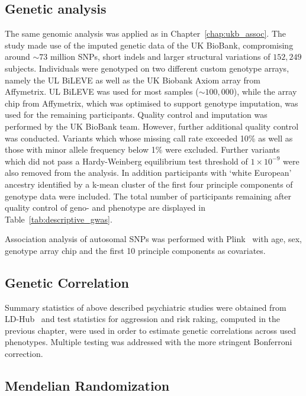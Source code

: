 \subsection{Genetic analysis}
\label{sub:genetic_analysis}

The same genomic analysis was applied as in Chapter~\ref{chap:ukb_assoc}.
The study made use of the imputed genetic data of the UK BioBank, compromising around $\sim73$ million SNPs, short indels and larger structural variations of $152,249$ subjects.
Individuals were genotyped on two different custom genotype arrays, namely the UL BiLEVE as well as the UK Biobank Axiom array from Affymetrix. 
UL BiLEVE was used for most samples ($\sim100,000$), while the array chip from Affymetrix, which was optimised to support genotype imputation, was used for the remaining participants. 
Quality control and imputation was performed by the UK BioBank team.
However, further additional quality control was conducted.
Variants which whose missing call rate exceeded 10\% as well as those with minor allele frequency below 1\% were excluded.
Further variants which did not pass a Hardy-Weinberg equilibrium test threshold of $1\times10^{-9}$ were also removed from the analysis.
In addition participants with `white European' ancestry identified by a k-mean cluster of the first four principle components of genotype data were included.
The total number of participants remaining after quality control of geno- and phenotype are displayed in Table~\ref{tab:descriptive_gwas}.

Association analysis of autosomal SNPs was performed with Plink~\cite{Purcell2007,Chang2015} with age, sex, genotype array chip and the first 10 principle components as covariates.

\subsection{Genetic Correlation}
\label{sub:genetic_correlation}

Summary statistics of above described psychiatric studies were obtained from LD-Hub~\cite{ZHENG2016} and test statistics for aggression and risk raking, computed in the previous chapter, were used in order to estimate genetic correlations across used phenotypes.
Multiple testing was addressed with the more stringent Bonferroni correction.

\subsection{Mendelian Randomization}
\label{sub:joint_association_study}

